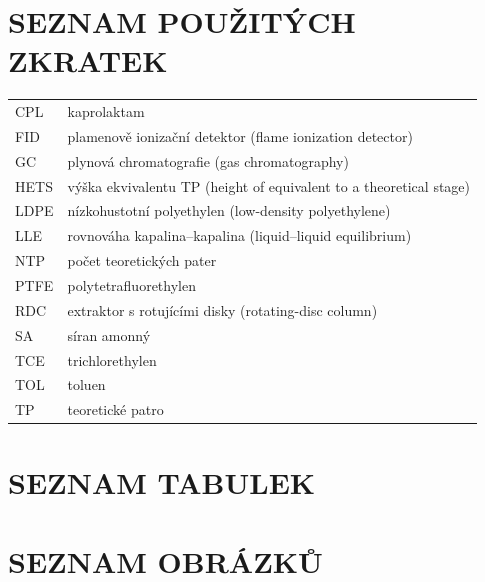 \documentclass[a4paper, 12pt]{article}
\begin{document}
\vspace{1cm} \section*{SEZNAM POUŽITÝCH ZKRATEK}
\begin{tabular}{ll}
	CPL & kaprolaktam \\
	FID & plamenově ionizační detektor (flame ionization detector) \\
	GC  & plynová chromatografie (gas chromatography) \\
	HETS& výška ekvivalentu TP (height of equivalent to a theoretical stage) \\
	LDPE& nízkohustotní polyethylen (low-density polyethylene) \\
	LLE & rovnováha kapalina--kapalina (liquid--liquid equilibrium) \\
	NTP & počet teoretických pater \\
	PTFE& polytetrafluorethylen \\
	RDC & extraktor s rotujícími disky (rotating-disc column) \\
	SA  & síran amonný \\
	TCE & trichlorethylen \\
	TOL & toluen \\
	TP  & teoretické patro \\
\end{tabular}
\onehalfspacing

\newpage \section*{SEZNAM TABULEK}
\renewcommand{\listtablename}{\vskip -1cm}
\listoftables

\newpage \section*{SEZNAM OBRÁZKŮ}
\renewcommand{\listfigurename}{\vskip -1cm}
\listoffigures
\end{document}
